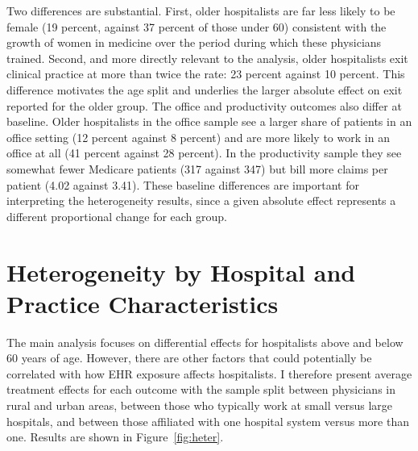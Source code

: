 \documentclass[12pt]{article}
\begin{document}


Two differences are substantial. First, older hospitalists are far less likely to
be female (19 percent, against 37 percent of those under 60) consistent with
the growth of women in medicine over the period during which these physicians
trained. Second, and more directly relevant to the analysis, older hospitalists
exit clinical practice at more than twice the rate: 23 percent against 10
percent. This difference motivates the age split and underlies the larger
absolute effect on exit reported for the older group. The office and productivity outcomes also differ at baseline. Older hospitalists
in the office sample see a larger share of patients in an office setting (12
percent against 8 percent) and are more likely to work in an office at all (41
percent against 28 percent). In the productivity sample they see somewhat fewer
Medicare patients (317 against 347) but bill more claims per patient (4.02
against 3.41). These baseline differences are important for interpreting the
heterogeneity results, since a given absolute effect represents a different
proportional change for each group.

\section{Heterogeneity by Hospital and Practice Characteristics}\label{sec:het}

The main analysis focuses on differential effects for hospitalists above and below 60 years of age. However, there are other factors that could potentially be correlated with how EHR exposure affects hospitalists. I therefore present average treatment effects for each outcome with the sample split between physicians in rural and urban areas, between those who typically work at small versus large hospitals, and between those affiliated with one hospital system versus more than one. Results are shown in Figure~\ref{fig:heter}. 
\end{document}
